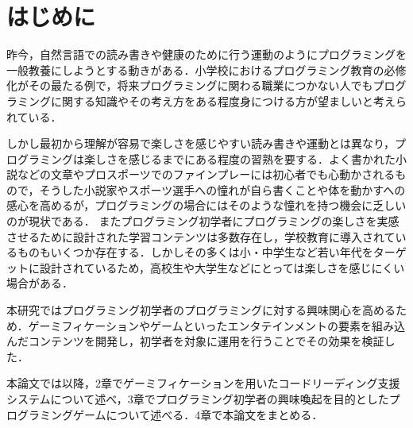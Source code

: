 \section{はじめに}


昨今，自然言語での読み書きや健康のために行う運動のようにプログラミングを一般教養にしようとする動きがある．小学校におけるプログラミング教育の必修化がその最たる例で，将来プログラミングに関わる職業につかない人でもプログラミングに関する知識やその考え方をある程度身につける方が望ましいと考えられている．

しかし最初から理解が容易で楽しさを感じやすい読み書きや運動とは異なり，プログラミングは楽しさを感じるまでにある程度の習熟を要する．よく書かれた小説などの文章やプロスポーツでのファインプレーには初心者でも心動かされるもので，そうした小説家やスポーツ選手への憧れが自ら書くことや体を動かすへの感心を高めるが，プログラミングの場合にはそのような憧れを持つ機会に乏しいのが現状である．
またプログラミング初学者にプログラミングの楽しさを実感させるために設計された学習コンテンツは多数存在し，学校教育に導入されているものもいくつか存在する．しかしその多くは小・中学生など若い年代をターゲットに設計されているため，高校生や大学生などにとっては楽しさを感じにくい場合がある．

本研究ではプログラミング初学者のプログラミングに対する興味関心を高めるため．ゲーミフィケーションやゲームといったエンタテインメントの要素を組み込んだコンテンツを開発し，初学者を対象に運用を行うことでその効果を検証した．

本論文では以降，2章でゲーミフィケーションを用いたコードリーディング支援システムについて述べ，3章でプログラミング初学者の興味喚起を目的としたプログラミングゲームについて述べる．4章で本論文をまとめる．